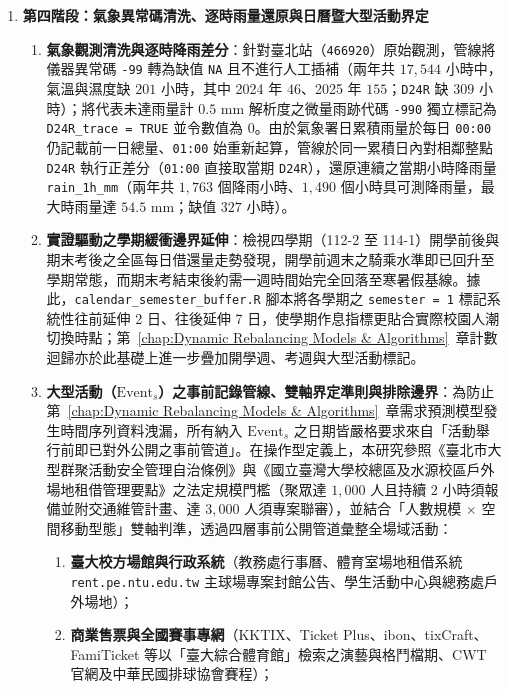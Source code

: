 \begin{enumerate}
    \item \textbf{第四階段：氣象異常碼清洗、逐時雨量還原與日曆暨大型活動界定}
    \begin{enumerate}[label = \textbullet]
        \item \textbf{氣象觀測清洗與逐時降雨差分}：針對臺北站（\texttt{466920}）原始觀測，管線將儀器異常碼 \texttt{-99} 轉為缺值 \texttt{NA} 且不進行人工插補（兩年共 $17{,}544$ 小時中，氣溫與濕度缺 $201$ 小時，其中 2024 年 $46$、2025 年 $155$；\texttt{D24R} 缺 $309$ 小時）；將代表未達雨量計 $0.5\text{ mm}$ 解析度之微量雨跡代碼 \texttt{-990} 獨立標記為 \texttt{D24R\_trace = TRUE} 並令數值為 $0$。由於氣象署日累積雨量於每日 \texttt{00:00} 仍記載前一日總量、\texttt{01:00} 始重新起算，管線於同一累積日內對相鄰整點 \texttt{D24R} 執行正差分（\texttt{01:00} 直接取當期 \texttt{D24R}），還原連續之當期小時降雨量 \texttt{rain\_1h\_mm}（兩年共 $1{,}763$ 個降雨小時、$1{,}490$ 個小時具可測降雨量，最大時雨量達 $54.5\text{ mm}$；缺值 $327$ 小時）。
        \item \textbf{實證驅動之學期緩衝邊界延伸}：檢視四學期（112-2 至 114-1）開學前後與期末考後之全區每日借還量走勢發現，開學前週末之騎乘水準即已回升至學期常態，而期末考結束後約需一週時間始完全回落至寒暑假基線。據此，\texttt{calendar\_semester\_buffer.R} 腳本將各學期之 \texttt{semester = 1} 標記系統性往前延伸 2 日、往後延伸 7 日，使學期作息指標更貼合實際校園人潮切換時點；第~\ref{chap:Dynamic Rebalancing Models & Algorithms}~章計數迴歸亦於此基礎上進一步疊加開學週、考週與大型活動標記。
        \item \textbf{大型活動（$\text{Event}_s$）之事前記錄管線、雙軸界定準則與排除邊界}：為防止第~\ref{chap:Dynamic Rebalancing Models & Algorithms}~章需求預測模型發生時間序列資料洩漏，所有納入 $\text{Event}_s$ 之日期皆嚴格要求來自「活動舉行前即已對外公開之事前管道」。在操作型定義上，本研究參照《臺北市大型群聚活動安全管理自治條例》與《國立臺灣大學校總區及水源校區戶外場地租借管理要點》之法定規模門檻（聚眾達 $1{,}000$ 人且持續 $2$ 小時須報備並附交通維管計畫、達 $3{,}000$ 人須專案聯審），並結合「人數規模 $\times$ 空間移動型態」雙軸判準，透過四層事前公開管道彙整全場域活動：
        \begin{enumerate}
          \item \textbf{臺大校方場館與行政系統}（教務處行事曆、體育室場地租借系統 \texttt{rent.pe.ntu.edu.tw} 主球場專案封館公告、學生活動中心與總務處戶外場地）；
          \item \textbf{商業售票與全國賽事專網}（KKTIX、Ticket Plus、ibon、tixCraft、FamiTicket 等以「臺大綜合體育館」檢索之演藝與格鬥檔期、CWT 官網及中華民國排球協會賽程）；

\end{enumerate}
\end{enumerate}
\end{enumerate}
